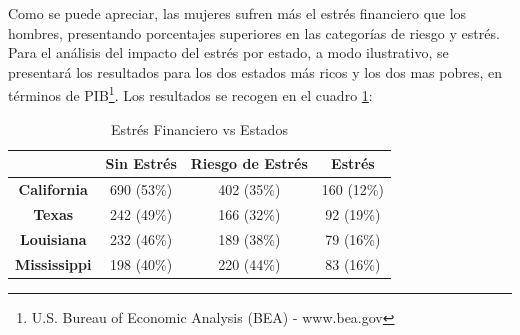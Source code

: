 \documentclass[a4paper, 11pt]{article}
\begin{document}
Como se puede apreciar, las mujeres sufren más el estrés financiero que los 
hombres, presentando porcentajes superiores en las categorías de riesgo y estrés. 
Para el análisis del impacto del estrés por estado, a modo ilustrativo, se presentará los resultados para los dos estados más ricos y los dos mas pobres, en términos de PIB\footnote{U.S. Bureau of Economic Analysis (BEA) - www.bea.gov}.
Los resultados se recogen en el cuadro \ref{tab:stress_vs_states}:

\begin{table}[ht]
\centering
\begin{tabular}{cccc }
\toprule
 & \textbf{Sin Estrés} & \textbf{Riesgo de Estrés} & \textbf{Estrés}\\
\midrule
\textbf{California} & 690 (53\%) & 402 (35\%)& 160 (12\%)\\
\textbf{Texas} & 242 (49\%)& 166 (32\%)& 92 (19\%)\\
\hline
\textbf{Louisiana} & 232 (46\%) & 189 (38\%)& 79 (16\%)\\
\textbf{Mississippi} & 198 (40\%)& 220 (44\%)& 83 (16\%)\\
\bottomrule
\end{tabular}
\caption{Estrés Financiero vs Estados}
\label{tab:stress_vs_states}
\end{table}
\end{document}
